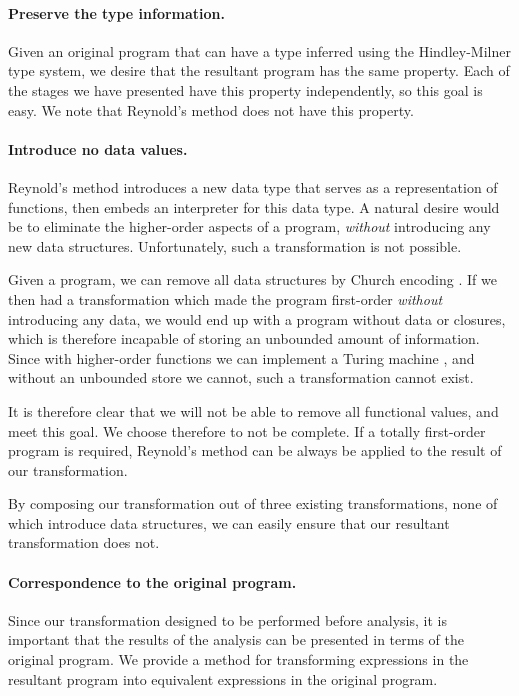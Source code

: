 \documentclass[preprint]{sigplanconf}
\begin{document}
\paragraph{Preserve the type information.} Given an original program that can have a type inferred using the Hindley-Milner type system, we desire that the resultant program has the same property. Each of the stages we have presented have this property independently, so this goal is easy. We note that Reynold's method does not have this property.

\paragraph{Introduce no data values.} Reynold's method introduces a new data type that serves as a representation of functions, then embeds an interpreter for this data type. A natural desire would be to eliminate the higher-order aspects of a program, \textit{without} introducing any new data structures. Unfortunately, such a transformation is not possible.

Given a program, we can remove all data structures by Church encoding \cite{church_encode}. If we then had a transformation which made the program first-order \textit{without} introducing any data, we would end up with a program without data or closures, which is therefore incapable of storing an unbounded amount of information. Since with higher-order functions we can implement a Turing machine \cite{turing:halting}, and without an unbounded store we cannot, such a transformation cannot exist.

It is therefore clear that we will not be able to remove all functional values, and meet this goal. We choose therefore to not be complete. If a totally first-order program is required, Reynold's method can be always be applied to the result of our transformation.

By composing our transformation out of three existing transformations, none of which introduce data structures, we can easily ensure that our resultant transformation does not.

\paragraph{Correspondence to the original program.} Since our transformation designed to be performed before analysis, it is important that the results of the analysis can be presented in terms of the original program. We provide a method for transforming expressions in the resultant program into equivalent expressions in the original program.
\end{document}
